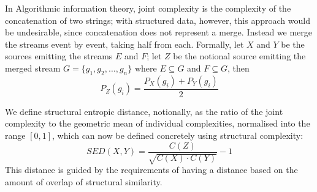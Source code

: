 In Algorithmic information theory, joint complexity is the complexity of the concatenation of two strings\cite{}; with structured data, however, this approach would be undesirable, since concatenation does not represent a merge.  Instead we merge  the streams event by event, taking half from each.  Formally, let $X$ and $Y$ be the sources emitting the streams $E$ and $F$; let $Z$ be the notional source emitting the merged stream $G = \{g_1, g_2, \ldots, g_n\}$ where $E \subseteq G$ and $F \subseteq G$, then  
\begin{equation}
	P_Z(g_i) = \frac{P_X(g_i) + P_Y(g_i)}{2}
\end{equation}

We define structural entropic distance, notionally, as the ratio of the joint complexity to the geometric mean of individual complexities, normalised into the range $[0,1]$, which can now be defined concretely using structural complexity: 
\begin{equation}
SED(X,Y) = \frac{C(Z)}{\sqrt{C(X) \cdot C(Y)}} - 1
\end{equation}
This distance is guided by the requirements of having a distance based on the amount of overlap of structural similarity. 
